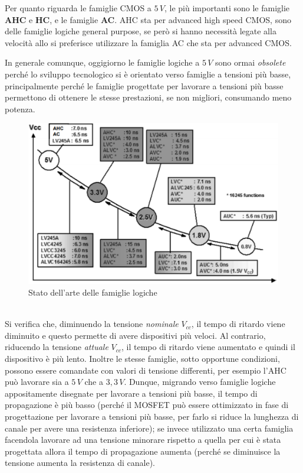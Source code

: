 \documentclass[12pt, a4paper]{report}
\begin{document}
Per quanto riguarda le famiglie CMOS a $5\,V$, le più importanti sono le famiglie \textbf{AHC} e \textbf{HC}, e le famiglie \textbf{AC}. AHC sta per advanced high speed CMOS, sono delle famiglie logiche general purpose, se però si hanno necessità legate alla velocità allo si preferisce utilizzare la famiglia AC che sta per advanced CMOS.

In generale comunque, oggigiorno le famiglie logiche a $5\,V$ sono ormai \textit{obsolete} perché lo sviluppo tecnologico si è orientato verso famiglie a tensioni più basse, principalmente perché le famiglie progettate per lavorare a tensioni più basse permettono di ottenere le stesse prestazioni, se non migliori, consumando meno potenza.
\begin{figure}[h]
    \centering
    \includegraphics[scale=0.38,angle=0]{state_of_art.png}
    \caption{Stato dell'arte delle famiglie logiche}
\end{figure}
\\Si verifica che, diminuendo la tensione \textit{nominale} $V_{cc}$, il tempo di ritardo viene diminuito e questo permette di avere dispositivi più veloci. Al contrario, riducendo la tensione \textit{attuale} $V_{cc}$, il tempo di ritardo viene aumentato e quindi il dispositivo è più lento. Inoltre le stesse famiglie, sotto opportune condizioni, possono essere comandate con valori di tensione differenti, per esempio l'AHC può lavorare sia a $5\,V$ che a $3,3\,V$. Dunque, migrando verso famiglie logiche appositamente disegnate per lavorare a tensioni più basse, il tempo di propagazione è più basso (perché il MOSFET può essere ottimizzato in fase di progettazione per lavorare a tensioni più basse, per farlo si riduce la lunghezza di canale per avere una resistenza inferiore); se invece utilizzato una certa famiglia facendola lavorare ad una tensione minorare rispetto a quella per cui è stata progettata allora il tempo di propagazione aumenta (perché se diminuisce la tensione aumenta la resistenza di canale).
\end{document}
